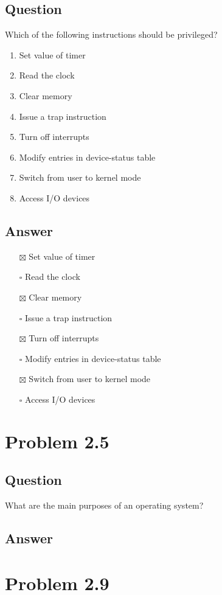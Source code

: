 \documentclass[a4paper]{article}
\begin{document}
\subsection{Question}
\label{sec:orgc516e04}
Which of the following instructions should be privileged?
\begin{enumerate}
\item Set value of timer
\item Read the clock
\item Clear memory
\item Issue a trap instruction
\item Turn off interrupts
\item Modify entries in device-status table
\item Switch from user to kernel mode
\item Access I/O devices
\end{enumerate}
\subsection{Answer}
\label{sec:org73a17d9}
\begin{enumerate}
\item[{$\boxtimes$}] Set value of timer
\item[{$\square$}] Read the clock
\item[{$\boxtimes$}] Clear memory
\item[{$\square$}] Issue a trap instruction
\item[{$\boxtimes$}] Turn off interrupts
\item[{$\square$}] Modify entries in device-status table
\item[{$\boxtimes$}] Switch from user to kernel mode
\item[{$\square$}] Access I/O devices
\end{enumerate}
\section{Problem 2.5}
\label{sec:org5272558}
\subsection{Question}
\label{sec:orgc1b4543}
What are the main purposes of an operating system?
\subsection{Answer}
\label{sec:orga581eea}
\section{Problem 2.9}
\label{sec:orgbdc945d}
\end{document}
